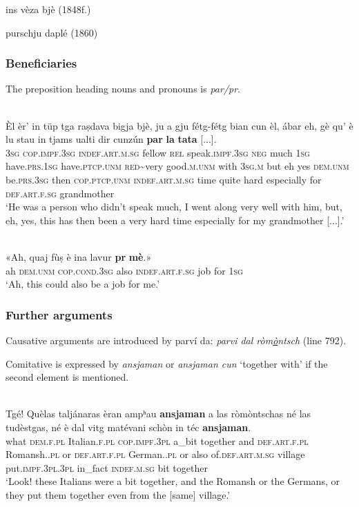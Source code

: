 ins vèza bjè (1848f.)

purschju daplé (1860)

\subsubsection{Beneficiaries}
The preposition heading nouns and pronouns is \textit{par/pr}.

\ea\label{}
\\
\gll  Èl èr’ in tüp tga raṣdava bigja bjè, ju a gju fétg-fétg bian cun èl, ábar eh, gè qu’ è lu stau in tjams ualti dir cunzún \textbf{par} \textbf{la} \textbf{tata} [...].\\
\textsc{3sg} \textsc{cop.impf.3sg} \textsc{indef.art.m.sg} fellow \textsc{rel} speak.\textsc{impf.3sg} \textsc{neg} much \textsc{1sg} have.\textsc{prs.1sg} have.\textsc{ptcp.unm} \textsc{red}\textasciitilde{very} good.\textsc{m.unm} with \textsc{3sg.m} but eh yes \textsc{dem.unm} be.\textsc{prs.3sg} then \textsc{cop.ptcp.unm} \textsc{indef.art.m.sg} time quite hard especially for \textsc{def.art.f.sg} grandmother\\
\glt `He was a person who didn’t speak much, I went along very well with him, but, eh, yes, this has then been a very hard time especially for my grandmother [...].'
\z

\ea
\label{}
\\
\gll «Ah, quaj fùṣ è ina lavur \textbf{pr} \textbf{mè}.»   \\
ah \textsc{dem.unm} \textsc{cop.cond.3sg} also \textsc{indef.art.f.sg} job for \textsc{1sg} \\
\glt `Ah, this could also be a job for me.'
\z





\subsubsection{Further arguments}

Causative arguments are introduced by parví da: \textit{parvi dal ròm\underline{ò}ntsch} (line 792).

Comitative is expressed by \textit{ansjaman} or \textit{ansjaman cun} `together with' if the second element is mentioned.

\ea
\label{}
\\
\gll    Tgé! Quèlas taljánaras èran ampʰau \textbf{ansjaman} a las ròmòntschas né las tudèstgas, né è dal vitg matévani schòn in téc \textbf{ansjaman}.\\
what \textsc{dem.f.pl} Italian.\textsc{f.pl} \textsc{cop.impf.3pl} a\_bit together and \textsc{def\textbf{}.art.f.pl} Romansh.\textsc{.pl} or  \textsc{def.art.f.pl} German.\textsc{.pl} or also of.\textsc{def.art.m.sg} village put.\textsc{impf.3pl.3pl} in\_fact \textsc{indef.m.sg} bit together\\
\glt `Look! these Italians were a bit together, and the Romansh or the Germans, or they put them together even from the [same] village.'
\z


